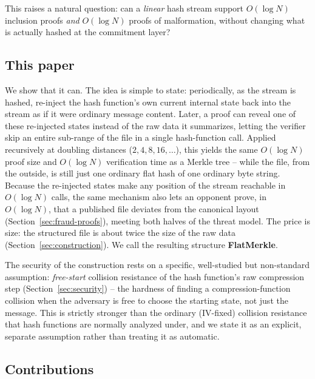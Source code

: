 This raises a natural question: can a \emph{linear} hash stream support
$O(\log N)$ inclusion proofs \emph{and} $O(\log N)$ proofs of malformation,
without changing what is actually hashed at the commitment layer?

\subsection*{This paper}

We show that it can. The idea is simple to state: periodically, as the
stream is hashed, re-inject the hash function's own current internal state
back into the stream as if it were ordinary message content. Later, a proof
can reveal one of these re-injected states instead of the raw data it
summarizes, letting the verifier skip an entire sub-range of the file in a
single hash-function call. Applied recursively at doubling distances
($2, 4, 8, 16, \dots$), this yields the same $O(\log N)$ proof size and
$O(\log N)$ verification time as a Merkle tree -- while the file, from the
outside, is still just one ordinary flat hash of one ordinary byte string.
Because the re-injected states make any position of the stream reachable in
$O(\log N)$ calls, the same mechanism also lets an opponent prove, in
$O(\log N)$, that a published file deviates from the canonical layout
(Section~\ref{sec:fraud-proofs}), meeting both halves of the threat model.
The price is size: the structured file is about twice the size of the raw
data (Section~\ref{sec:construction}).
We call the resulting structure \textbf{FlatMerkle}.

The security of the construction rests on a specific, well-studied but
non-standard assumption: \emph{free-start} collision resistance of the
hash function's raw compression step (Section~\ref{sec:security}) -- the
hardness of finding a compression-function collision when the adversary is
free to choose the starting state, not just the message. This is strictly
stronger than the ordinary (IV-fixed) collision resistance that hash
functions are normally analyzed under, and we state it as an explicit,
separate assumption rather than treating it as automatic.

\subsection*{Contributions}

